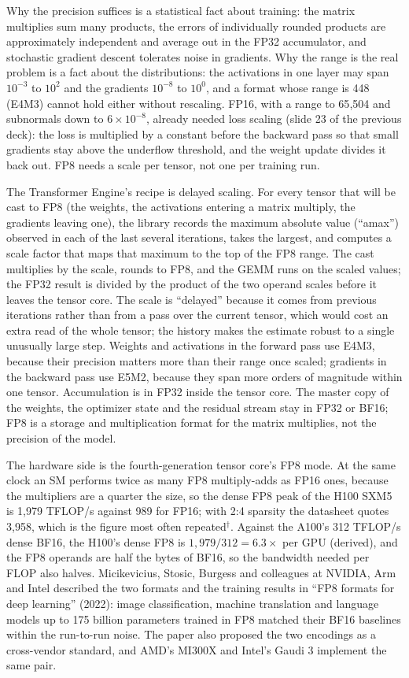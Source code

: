 \documentclass[11pt,letterpaper]{article}
\begin{document}
Why the precision suffices is a statistical fact about training: the matrix multiplies sum many products, the errors of individually rounded products are approximately independent and average out in the FP32 accumulator, and stochastic gradient descent tolerates noise in gradients. Why the range is the real problem is a fact about the distributions: the activations in one layer may span $10^{-3}$ to $10^{2}$ and the gradients $10^{-8}$ to $10^{0}$, and a format whose range is 448 (E4M3) cannot hold either without rescaling. FP16, with a range to 65{,}504 and subnormals down to $6\times10^{-8}$, already needed loss scaling (slide 23 of the previous deck): the loss is multiplied by a constant before the backward pass so that small gradients stay above the underflow threshold, and the weight update divides it back out. FP8 needs a scale per tensor, not one per training run.

The Transformer Engine's recipe is delayed scaling. For every tensor that will be cast to FP8 (the weights, the activations entering a matrix multiply, the gradients leaving one), the library records the maximum absolute value (``amax'') observed in each of the last several iterations, takes the largest, and computes a scale factor that maps that maximum to the top of the FP8 range. The cast multiplies by the scale, rounds to FP8, and the GEMM runs on the scaled values; the FP32 result is divided by the product of the two operand scales before it leaves the tensor core. The scale is ``delayed'' because it comes from previous iterations rather than from a pass over the current tensor, which would cost an extra read of the whole tensor; the history makes the estimate robust to a single unusually large step. Weights and activations in the forward pass use E4M3, because their precision matters more than their range once scaled; gradients in the backward pass use E5M2, because they span more orders of magnitude within one tensor. Accumulation is in FP32 inside the tensor core. The master copy of the weights, the optimizer state and the residual stream stay in FP32 or BF16; FP8 is a storage and multiplication format for the matrix multiplies, not the precision of the model.

The hardware side is the fourth-generation tensor core's FP8 mode. At the same clock an SM performs twice as many FP8 multiply-adds as FP16 ones, because the multipliers are a quarter the size, so the dense FP8 peak of the H100 SXM5 is 1{,}979 TFLOP/s against 989 for FP16; with 2:4 sparsity the datasheet quotes 3{,}958, which is the figure most often repeated$^\dagger$. Against the A100's 312 TFLOP/s dense BF16, the H100's dense FP8 is $1{,}979/312 = 6.3\times$ per GPU (derived), and the FP8 operands are half the bytes of BF16, so the bandwidth needed per FLOP also halves. Micikevicius, Stosic, Burgess and colleagues at NVIDIA, Arm and Intel described the two formats and the training results in ``FP8 formats for deep learning'' (2022): image classification, machine translation and language models up to 175 billion parameters trained in FP8 matched their BF16 baselines within the run-to-run noise. The paper also proposed the two encodings as a cross-vendor standard, and AMD's MI300X and Intel's Gaudi 3 implement the same pair.
\end{document}
